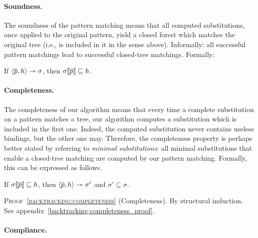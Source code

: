 \paragraph{Soundness.}

The soundness of the pattern matching means that all computed
substitutions, once applied to the original pattern, yield a closed
forest which matches the original tree (i.e., is included in it in the
sense above). Informally: all successful pattern matchings lead to
successful closed\hyp{}tree matchings. Formally:
\begin{theorem}[Soundness]\hfill
\label{backtracking:soundness}
\begin{center}
If \(\smat{h}{\overline{p}} \twoheadrightarrow \sigma\),
then \(\subst{\overline{p}}{\sigma} \sqsubseteq h\).
\end{center}
\end{theorem}

\medskip



\paragraph{Completeness.}

The completeness of our algorithm means that every time a complete
substitution on a pattern matches a tree, our algorithm computes a
substitution which is included in the first one. Indeed, the computed
substitution never contains useless bindings, but the other one
may. Therefore, the completeness property is perhaps better stated by
referring to \emph{minimal substitutions}: all minimal substitutions
that enable a closed\hyp{}tree matching are computed by our pattern
matching. Formally, this can be expressed as follows.
\begin{theorem}[Completeness]\hfill
\label{backtracking:completeness}
\begin{center}
If   \(\subst{\overline{p}}{\sigma} \sqsubseteq h\),
then \(\smat{h}{\overline{p}} \twoheadrightarrow \sigma'\)
and  \(\sigma' \subseteq \sigma\).
\end{center}
\end{theorem}

\medskip

\noindent\textsc{Proof~\ref{backtracking:completeness}}
(Completeness). By structural induction. See
appendix~\ref{backtracking:completeness_proof}.


\paragraph{Compliance.}

